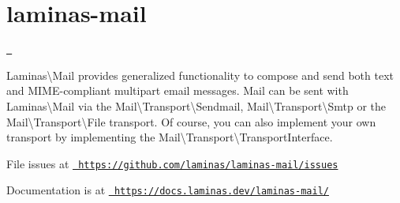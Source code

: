 \chapter{laminas-\/mail}
\hypertarget{md_public_2glpi_2vendor_2laminas_2laminas-mail_2_r_e_a_d_m_e}{}\label{md_public_2glpi_2vendor_2laminas_2laminas-mail_2_r_e_a_d_m_e}
\label{md_public_2glpi_2vendor_2laminas_2laminas-mail_2_r_e_a_d_m_e_autotoc_md6283}%
%
 \href{https://github.com/laminas/laminas-mail/actions?query=workflow\%3A}{\texttt{ }}

{\ttfamily Laminas\textbackslash{}Mail} provides generalized functionality to compose and send both text and MIME-\/compliant multipart email messages. Mail can be sent with {\ttfamily Laminas\textbackslash{}Mail} via the {\ttfamily Mail\textbackslash{}Transport\textbackslash{}Sendmail}, {\ttfamily Mail\textbackslash{}Transport\textbackslash{}Smtp} or the {\ttfamily Mail\textbackslash{}Transport\textbackslash{}File} transport. Of course, you can also implement your own transport by implementing the {\ttfamily Mail\textbackslash{}Transport\textbackslash{}Transport\+Interface}.


\begin{DoxyItemize}
\item File issues at \href{https://github.com/laminas/laminas-mail/issues}{\texttt{ https\+://github.\+com/laminas/laminas-\/mail/issues}}
\item Documentation is at \href{https://docs.laminas.dev/laminas-mail/}{\texttt{ https\+://docs.\+laminas.\+dev/laminas-\/mail/}} 
\end{DoxyItemize}